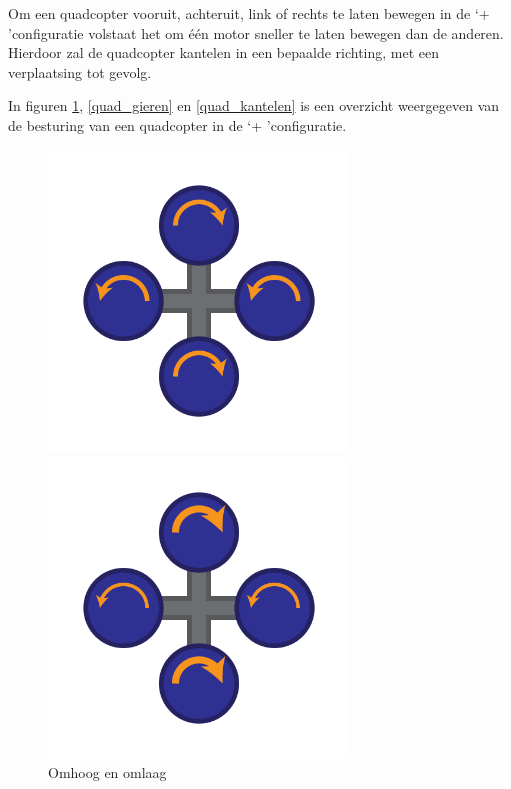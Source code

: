 			\par Om een quadcopter vooruit, achteruit, link of rechts te laten bewegen in de \textquoteleft + \textquoteright  configuratie volstaat het om \'e\'en motor sneller te laten bewegen dan de anderen. Hierdoor zal de quadcopter kantelen in een bepaalde richting, met een verplaatsing tot gevolg.

			\par In figuren \ref{quad_up_down}, \ref{quad_gieren} en \ref{quad_kantelen} is een overzicht weergegeven van de besturing van een quadcopter in de \textquoteleft + \textquoteright configuratie.

		\begin{figure}[H]
			\centering
				\begin{minipage}[b]{0.3\textwidth}
					\centering
					\includegraphics[height = 8cm, valign = b,width=\linewidth]{Vooronderzoek/quad_up_down.png}
					\caption[Omhoog en omlaag]{Omhoog en omlaag}
					\label{quad_up_down}
				\end{minipage}
			\quad
				\begin{minipage}[b]{0.3\textwidth}
					\centering
					\includegraphics[height = 8cm, valign = b,width=\linewidth]{Vooronderzoek/quad_gieren.png}

\end{minipage}
\end{figure}
